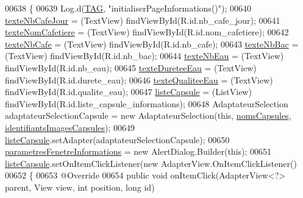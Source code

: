 \begin{DoxyCode}
00638     \{
00639         Log.d(\hyperlink{classcom_1_1example_1_1ekawa_1_1_ihm_a95cd92c2acaf9f8982302da08d94f9aa}{TAG}, \textcolor{stringliteral}{"initialiserPageInformations()"});
00640         \hyperlink{classcom_1_1example_1_1ekawa_1_1_ihm_a06f0f159882f0c5c3e3cca7f698489c9}{texteNbCafeJour} = (TextView) findViewById(R.id.nb\_cafe\_jour);
00641         \hyperlink{classcom_1_1example_1_1ekawa_1_1_ihm_abc84321aabf4b59d9e452afdb878357f}{texteNomCafetiere} = (TextView) findViewById(R.id.nom\_cafetiere);
00642         \hyperlink{classcom_1_1example_1_1ekawa_1_1_ihm_a30418331964030ba9c2cb5f4e7b34b2c}{texteNbCafe} = (TextView) findViewById(R.id.nb\_cafe);
00643         \hyperlink{classcom_1_1example_1_1ekawa_1_1_ihm_a96074c1992a3a44734b3c82e5cdf073b}{texteNbBac} = (TextView) findViewById(R.id.nb\_bac);
00644         \hyperlink{classcom_1_1example_1_1ekawa_1_1_ihm_a6abf08d241bab230727c22069aa7913c}{texteNbEau} = (TextView) findViewById(R.id.nb\_eau);
00645         \hyperlink{classcom_1_1example_1_1ekawa_1_1_ihm_ac19dc1f761f988fcd51bbdb6f67a4009}{texteDureteeEau} = (TextView) findViewById(R.id.durete\_eau);
00646         \hyperlink{classcom_1_1example_1_1ekawa_1_1_ihm_af66cb31129c00413279e8254a6599143}{texteQualiteeEau} = (TextView) findViewById(R.id.qualite\_eau);
00647         \hyperlink{classcom_1_1example_1_1ekawa_1_1_ihm_a955e0c1674ee1ddfbf05f3ef6a081d67}{listeCapsule} = (ListView) findViewById(R.id.liste\_capsule\_informations);
00648         AdaptateurSelection adaptateurSelectionCapsule = \textcolor{keyword}{new} AdaptateurSelection(\textcolor{keyword}{this}, 
      \hyperlink{classcom_1_1example_1_1ekawa_1_1_ihm_a9d61b7bfd998d449bb405dcf5e6e4e89}{nomsCapsules}, \hyperlink{classcom_1_1example_1_1ekawa_1_1_ihm_af35b42764d9f7b10c8bc0e210c3ba76d}{identifiantsImagesCapsules});
00649         \hyperlink{classcom_1_1example_1_1ekawa_1_1_ihm_a955e0c1674ee1ddfbf05f3ef6a081d67}{listeCapsule}.setAdapter(adaptateurSelectionCapsule);
00650         \hyperlink{classcom_1_1example_1_1ekawa_1_1_ihm_a610b25d0bf8b26fbf1ed24345acef189}{parametresFenetreInformations} = \textcolor{keyword}{new} AlertDialog.Builder(\textcolor{keyword}{this});
00651         \hyperlink{classcom_1_1example_1_1ekawa_1_1_ihm_a955e0c1674ee1ddfbf05f3ef6a081d67}{listeCapsule}.setOnItemClickListener(\textcolor{keyword}{new} AdapterView.OnItemClickListener()
00652         \{
00653             @Override
00654             \textcolor{keyword}{public} \textcolor{keywordtype}{void} onItemClick(AdapterView<?> parent, View view, \textcolor{keywordtype}{int} position, \textcolor{keywordtype}{long} \textcolor{keywordtype}{id})

\end{DoxyCode}
